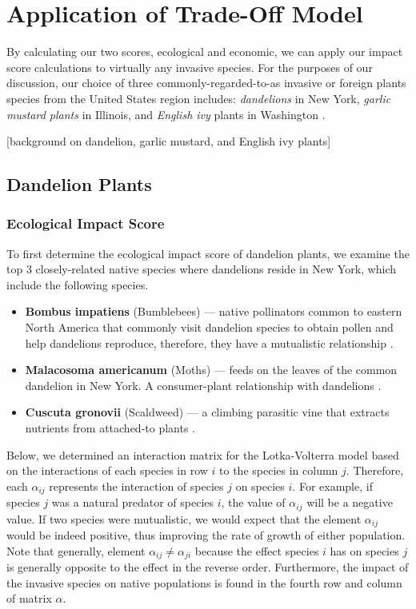 \section{Application of Trade-Off Model}

By calculating our two scores, ecological and economic, we can apply our impact score calculations to virtually any invasive species. For the purposes of our discussion, our choice of three commonly-regarded-to-as invasive or foreign plants species from the United States region includes: \textit{dandelions} in New York, \textit{garlic mustard plants} in Illinois, and  \textit{English ivy} plants in Washington \cite{columbiatribuneDandelionsFight, natureGarlicMustard, invasiveEnglishHedera}.

[background on dandelion, garlic mustard, and English ivy plants]

\subsection{Dandelion Plants}
\subsubsection{Ecological Impact Score}

To first determine the ecological impact score of dandelion plants, we examine the top 3 closely-related native species where dandelions reside in New York, which include the following species.

\begin{itemize}
    \item \textbf{Bombus impatiens} (Bumblebees) — native pollinators common to eastern North America that commonly visit dandelion species to obtain pollen and help dandelions reproduce, therefore, they have a mutualistic relationship \cite{nwfCommonEastern}.
    \item \textbf{Malacosoma americanum} (Moths) — feeds on the leaves of the common dandelion in New York. A consumer-plant relationship with dandelions \cite{butterfliesandmothsEasternTent}.
    \item \textbf{Cuscuta gronovii} (Scaldweed) — a climbing parasitic vine that extracts nutrients from attached-to plants \cite{minnesotawildflowersCuscutaGronovii}.
\end{itemize}

Below, we determined an interaction matrix for the Lotka-Volterra model based on the interactions of each species in row \(i\) to the species in column \(j\). Therefore, each \(\alpha_{ij}\) represents the interaction of species \(j\) on species \(i\). For example, if species \(j\) was a natural predator of species \(i\), the value of \(\alpha_{ij}\) will be a negative value. If two species were mutualistic, we would expect that the element \(\alpha_{ij}\) would be indeed positive, thus improving the rate of growth of either population. Note that generally, element \(\alpha_{ij} \neq \alpha_{ji}\) because the effect species \(i\) has on species \(j\) is generally opposite to the effect in the reverse order. Furthermore, the impact of the invasive species on native populations is found in the fourth row and column of matrix \(\alpha\).

